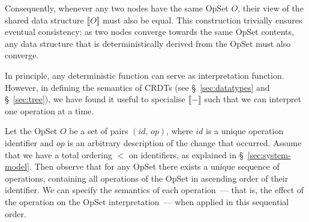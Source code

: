 Consequently, whenever any two nodes have the same OpSet $O$, their view of the shared data structure $\llbracket O \rrbracket$ must also be equal.
This construction trivially ensures eventual consistency: as two nodes converge towards the same OpSet contents, any data structure that is deterministically derived from the OpSet must also converge.

In principle, any deterministic function can serve as interpretation function.
However, in defining the semantics of CRDTs (see \S~\ref{sec:datatypes} and \S~\ref{sec:tree}), we have found it useful to specialise $\llbracket-\rrbracket$ such that we can interpret one operation at a time.

Let the OpSet $O$ be a set of pairs $(\mathit{id},\, \mathit{op})$, where $\mathit{id}$ is a unique operation identifier and $\mathit{op}$ is an arbitrary description of the change that occurred.
Assume that we have a total ordering $<$ on identifiers, as explained in \S~\ref{sec:system-model}.
Then observe that for any OpSet there exists a unique sequence of operations, containing all operations of the OpSet in ascending order of their identifier.
We can specify the semantics of each operation~--- that is, the effect of the operation on the OpSet interpretation~--- when applied in this sequential order.

